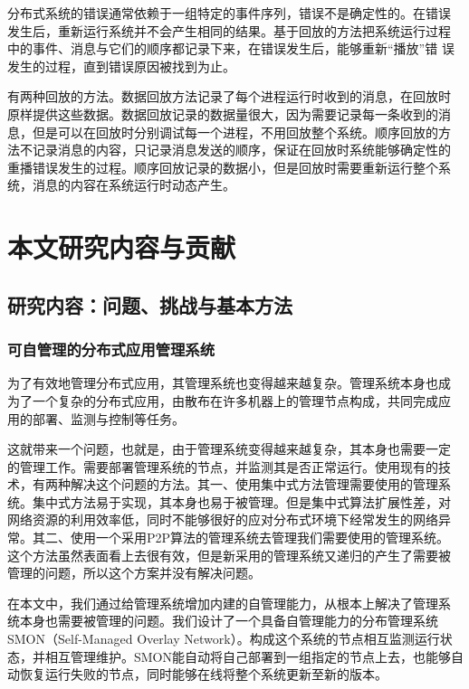 分布式系统的错误通常依赖于一组特定的事件序列，错误不是确定性的。在错误
发生后，重新运行系统并不会产生相同的结果。基于回放的方法把系统运行过程
中的事件、消息与它们的顺序都记录下来，在错误发生后，能够重新“播放”错
误发生的过程，直到错误原因被找到为止。

有两种回放的方法。数据回放方法记录了每个进程运行时收到的消息，在回放时
原样提供这些数据。数据回放记录的数据量很大，因为需要记录每一条收到的消
息，但是可以在回放时分别调试每一个进程，不用回放整个系统。顺序回放的方
法不记录消息的内容，只记录消息发送的顺序，保证在回放时系统能够确定性的
重播错误发生的过程。顺序回放记录的数据小，但是回放时需要重新运行整个系
统，消息的内容在系统运行时动态产生。

% 
% 
% 
% 
% 
% 
% 
% 
% 
% 


\section{本文研究内容与贡献}

\subsection{研究内容：问题、挑战与基本方法}

\subsubsection*{可自管理的分布式应用管理系统}

为了有效地管理分布式应用，其管理系统也变得越来越复杂。管理系统本身也成
为了一个复杂的分布式应用，由散布在许多机器上的管理节点构成，共同完成应
用的部署、监测与控制等任务。

这就带来一个问题，也就是，由于管理系统变得越来越复杂，其本身也需要一定
的管理工作。需要部署管理系统的节点，并监测其是否正常运行。使用现有的技
术，有两种解决这个问题的方法。其一、使用集中式方法管理需要使用的管理系
统。集中式方法易于实现，其本身也易于被管理。但是集中式算法扩展性差，对
网络资源的利用效率低，同时不能够很好的应对分布式环境下经常发生的网络异
常。其二、使用一个采用P2P算法的管理系统去管理我们需要使用的管理系统。
这个方法虽然表面看上去很有效，但是新采用的管理系统又递归的产生了需要被
管理的问题，所以这个方案并没有解决问题。

在本文中，我们通过给管理系统增加内建的自管理能力，从根本上解决了管理系
统本身也需要被管理的问题。我们设计了一个具备自管理能力的分布管理系统
SMON（Self-Managed Overlay Network）。构成这个系统的节点相互监测运行状
态，并相互管理维护。SMON能自动将自己部署到一组指定的节点上去，也能够自
动恢复运行失败的节点，同时能够在线将整个系统更新至新的版本。

